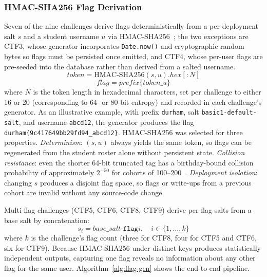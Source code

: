 \subsubsection{HMAC-SHA256 Flag Derivation}

Seven of the nine challenges derive flags deterministically
from a per-deployment salt $s$ and a student username $u$ via
HMAC-SHA256~\cite{rfc2104}; the two exceptions are CTF3,
whose generator incorporates \texttt{Date.now()} and
cryptographic random bytes so flags must be persisted once
emitted, and CTF4, whose per-user flags are pre-seeded into
the database rather than derived from a salted username.
\begin{equation}
\mathit{token} = \mathrm{HMAC\text{-}SHA256}(s, u).\mathit{hex}[{:}N]
\label{eq:hmac-flag}
\end{equation}
\begin{equation}
\mathit{flag} = \mathit{prefix}\texttt{\{}\mathit{token}\texttt{\_}u\texttt{\}}
\label{eq:flag-format}
\end{equation}
where $N$ is the token length in hexadecimal characters,
set per challenge to either 16 or 20 (corresponding to 64-
or 80-bit entropy) and recorded in each challenge's generator.
As an illustrative example,
with prefix \texttt{durham}, salt
\texttt{basic1-default-salt}, and username \texttt{abcd12},
the generator produces the flag
\texttt{durham\{9c417649bb29fd94\_abcd12\}}. HMAC-SHA256 was
selected for three properties. \textit{Determinism}: $(s, u)$
always yields the same token, so flags can be regenerated
from the student roster alone without persistent state.
\textit{Collision resistance}: even the shorter 64-bit
truncated tag has a birthday-bound collision probability of
approximately $2^{-50}$ for cohorts of
100--200~\cite{HMACNIST}. \textit{Deployment isolation}:
changing $s$ produces a disjoint flag space, so flags or
write-ups from a previous cohort are invalid without any
source-code change.

Multi-flag challenges (CTF5, CTF6, CTF8, CTF9) derive
per-flag salts from a base salt by concatenation:
\begin{equation}
s_i = \mathit{base\_salt}\texttt{-flag}i, \quad i \in \{1, \dots, k\}
\label{eq:per-flag-salt}
\end{equation}
where $k$ is the challenge's flag count (three for CTF8,
four for CTF5 and CTF6, six for CTF9).
Because HMAC-SHA256 under distinct keys produces
statistically independent outputs, capturing one flag reveals
no information about any other flag for the same user.
Algorithm~\ref{alg:flag-gen} shows the end-to-end pipeline.

